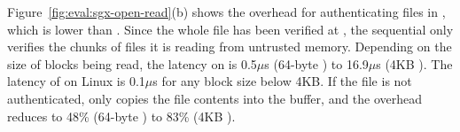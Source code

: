 Figure~\ref{fig:eval:sgx-open-read}(b)
shows the overhead for authenticating files in , which 
is lower than .
Since the whole file has been verified at , the sequential  only verifies the chunks of files it is reading from untrusted memory.
Depending on the size of blocks being read, the latency on \graphenesgx{} is 0.5$\mu$s (64-byte ) to 16.9$\mu$s (4KB ). The latency of  on Linux is \roughly{}0.1$\mu$s for any block size below 4KB.
If the file is not authenticated,
\graphenesgx{} only copies the file contents into the buffer, and the overhead reduces to 48\% (64-byte ) to 83\% (4KB ).





